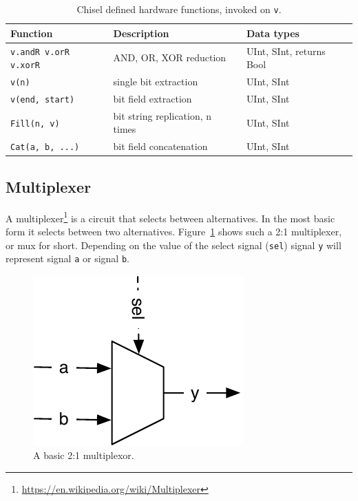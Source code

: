\documentclass[%
    10pt,
    headinclude, footexclude,
    openright, %
    notitlepage,
    cleardoubleempty,
    headsepline,
    pointlessnumbers,
    bibtotoc, idxtotoc,
    ]{scrbook}
\newcommand{\code}[1]{{\small{\texttt{#1}}}}
\newcommand{\scale}{0.7}
\newcommand{\myref}[2]{\href{#1}{#2}}
\renewcommand{\myref}[2]{{#2}{\footnote{\url{#1}}}}
\begin{document}
\begin{table}
 \centering
 \label{tab:functions}
  \begin{tabular}{lll}
    \toprule
    Function & Description & Data types \\
    \midrule
    \code{v.andR v.orR v.xorR} & AND, OR, XOR reduction & UInt, SInt, returns Bool \\
    \code{v(n)} & single bit extraction & UInt, SInt \\
    \code{v(end, start)} & bit field extraction & UInt, SInt \\
    \code{Fill(n, v)} & bit string replication, n times & UInt, SInt \\
    \code{Cat(a, b, ...)} & bit field concatenation & UInt, SInt \\
    \bottomrule 
  \end{tabular} 
  \caption{Chisel defined hardware functions, invoked on \code{v}.}
\end{table}                                            
    

\subsection{Multiplexer}

A \myref{https://en.wikipedia.org/wiki/Multiplexer}{multiplexer} is a circuit that selects between alternatives.
In the most basic form it selects between two alternatives. Figure~\ref{fig:mux} shows
such a 2:1 multiplexer, or mux for short. Depending on the value of the
select signal (\code{sel}) signal \code{y} will represent signal \code{a} or
signal \code{b}.

\begin{figure}
  \centering
  \includegraphics[scale=\scale]{figures/mux}
  \caption{A basic 2:1 multiplexor.}
  \label{fig:mux}
\end{figure}
\end{document}
